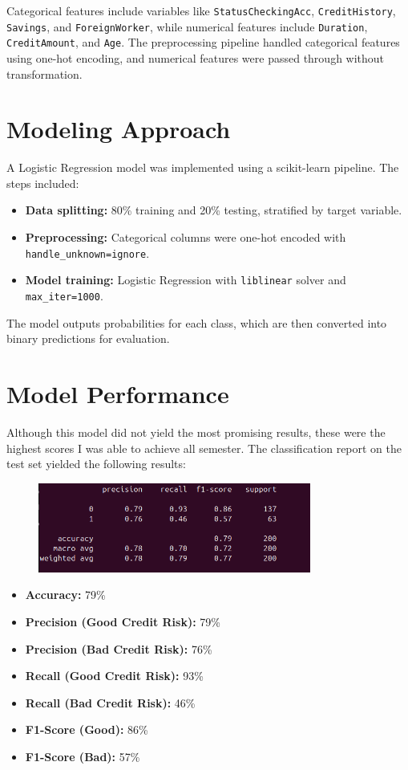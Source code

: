 \documentclass[12pt]{article}
\begin{document}
	Categorical features include variables like \texttt{StatusCheckingAcc}, \texttt{CreditHistory}, \texttt{Savings}, and \texttt{ForeignWorker}, while numerical features include \texttt{Duration}, \texttt{CreditAmount}, and \texttt{Age}. The preprocessing pipeline handled categorical features using one-hot encoding, and numerical features were passed through without transformation.
	
	\section{Modeling Approach}
	A Logistic Regression model was implemented using a scikit-learn pipeline. The steps included:
	\begin{itemize}
		\item \textbf{Data splitting:} 80\% training and 20\% testing, stratified by target variable.
		\item \textbf{Preprocessing:} Categorical columns were one-hot encoded with \texttt{handle\_unknown=\textquotesingle ignore\textquotesingle}.
		\item \textbf{Model training:} Logistic Regression with \texttt{liblinear} solver and \texttt{max\_iter=1000}.
	\end{itemize}
	
	The model outputs probabilities for each class, which are then converted into binary predictions for evaluation.
	
	\section{Model Performance}
	Although this model did not yield the most promising results, these were the highest scores I was able to achieve all semester. The classification report on the test set yielded the following results:\newpage
	
	\begin{figure}[h]
		\centering
		\includegraphics[width=0.8\textwidth]{AccScores.png}
		\label{fig:acc_scores}
	\end{figure}
	
	\begin{itemize}
		\item \textbf{Accuracy:} 79\%
		\item \textbf{Precision (Good Credit Risk):} 79\%
		\item \textbf{Precision (Bad Credit Risk):} 76\%
		\item \textbf{Recall (Good Credit Risk):} 93\%
		\item \textbf{Recall (Bad Credit Risk):} 46\%
		\item \textbf{F1-Score (Good):} 86\%
		\item \textbf{F1-Score (Bad):} 57\%
	\end{itemize}
	
\end{document}
